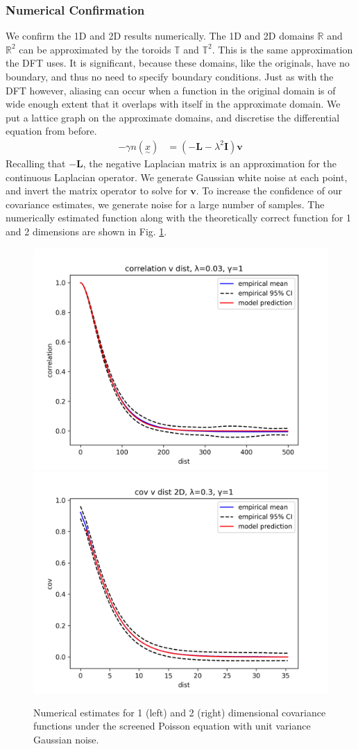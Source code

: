 \documentclass[12pt,a4paper]{article} %
\newcommand{\ve}[1]{\underset{\sim}{#1}}
\begin{document}
\subsubsection{Numerical Confirmation}
We confirm the 1D and 2D results numerically. The 1D and 2D domains $\mathbb{R}$ and $\mathbb{R}^2$ can be approximated by the toroids $\mathbb{T}$ and $\mathbb{T}^2$. This is the same approximation the DFT uses. It is significant, because these domains, like the originals, have no boundary, and thus no need to specify boundary conditions. Just as with the DFT however, aliasing can occur when a function in the original domain is of wide enough extent that it overlaps with itself in the approximate domain. We put a lattice graph on the approximate domains, and discretise the differential equation from before.
\begin{align*}
    -\gamma n(\ve{x})&=(-\mathbf{L}-\lambda^2\mathbf{I})\mathbf{v}
\end{align*}
Recalling that $-\mathbf{L}$, the negative Laplacian matrix is an approximation for the continuous Laplacian operator. We generate Gaussian white noise at each point, and invert the matrix operator to solve for $\mathbf{v}$. To increase the confidence of our covariance estimates, we generate noise for a large number of samples. The numerically estimated function along with the theoretically correct function for 1 and 2 dimensions are shown in Fig. \ref{fig:numerical_cov}.

\begin{figure}[!ht]
    \centering
    \includegraphics[width=.45\linewidth]{one_D_cov_modelling_l0.03_g1.png}
    \includegraphics[width=.45\linewidth]{two_D_cov_modelling_l0.3_g1.png}
    \caption{Numerical estimates for 1 (left) and 2 (right) dimensional covariance functions under the screened Poisson equation with unit variance Gaussian noise.}
    \label{fig:numerical_cov}
\end{figure}
\end{document}
